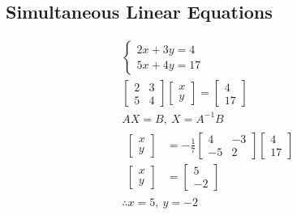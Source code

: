 \documentclass[10pt, a4paper, titlepage]{article}
\begin{document}
\begin{multicols*}{3}
\subsection{Simultaneous Linear Equations}
\begin{gather}
	\begin{cases}
		2x+3y=4\\
		5x+4y=17
	\end{cases}\\
	\begin{bmatrix}
		2 & 3\\
		5 & 4
	\end{bmatrix}
	\begin{bmatrix}
		x\\
		y
	\end{bmatrix}
	=
	\begin{bmatrix}
		4\\
		17
	\end{bmatrix}\\
	AX=B,\ X=A^{-1}B\\
	\begin{align}
		\begin{bmatrix}
			x\\
			y
		\end{bmatrix}
		&=-\frac{1}{7}
		\begin{bmatrix}
			4 & -3\\
			-5 & 2
		\end{bmatrix}
		\begin{bmatrix}
			4\\
			17
		\end{bmatrix}\\
		\begin{bmatrix}
			x\\
			y
		\end{bmatrix}
		&=
		\begin{bmatrix}
			5\\
			-2
		\end{bmatrix}
	\end{align}\\
	\therefore x=5,\ y=-2
\end{gather}
\dotfill

\end{multicols*}
\end{document}
